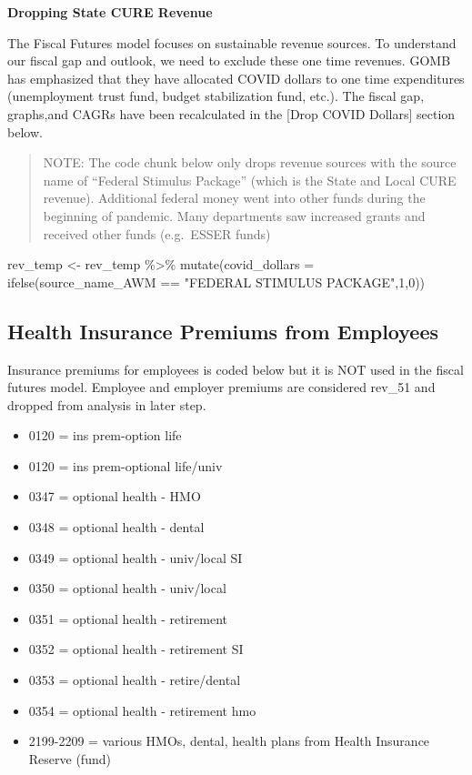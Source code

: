 \documentclass[
  letterpaper,
  DIV=11,
  numbers=noendperiod]{scrreport}
\newenvironment{Shaded}{\begin{snugshade}}{\end{snugshade}}
\newcommand{\AttributeTok}[1]{\textcolor[rgb]{0.40,0.45,0.13}{#1}}
\newcommand{\DecValTok}[1]{\textcolor[rgb]{0.68,0.00,0.00}{#1}}
\newcommand{\FunctionTok}[1]{\textcolor[rgb]{0.28,0.35,0.67}{#1}}
\newcommand{\NormalTok}[1]{\textcolor[rgb]{0.00,0.23,0.31}{#1}}
\newcommand{\OtherTok}[1]{\textcolor[rgb]{0.00,0.23,0.31}{#1}}
\newcommand{\SpecialCharTok}[1]{\textcolor[rgb]{0.37,0.37,0.37}{#1}}
\newcommand{\StringTok}[1]{\textcolor[rgb]{0.13,0.47,0.30}{#1}}
\providecommand{\tightlist}{%
  \setlength{\itemsep}{0pt}\setlength{\parskip}{0pt}}\usepackage{longtable,booktabs,array}
\begin{document}
\textbf{Dropping State CURE Revenue}

The Fiscal Futures model focuses on sustainable revenue sources. To
understand our fiscal gap and outlook, we need to exclude these one time
revenues. GOMB has emphasized that they have allocated COVID dollars to
one time expenditures (unemployment trust fund, budget stabilization
fund, etc.). The fiscal gap, graphs,and CAGRs have been recalculated in
the {[}Drop COVID Dollars{]} section below.

\begin{quote}
NOTE: The code chunk below only drops revenue sources with the source
name of ``Federal Stimulus Package'' (which is the State and Local CURE
revenue). Additional federal money went into other funds during the
beginning of pandemic. Many departments saw increased grants and
received other funds (e.g.~ESSER funds)
\end{quote}

\begin{Shaded}
\begin{Highlighting}[]
\NormalTok{rev\_temp }\OtherTok{\textless{}{-}}\NormalTok{ rev\_temp }\SpecialCharTok{\%\textgreater{}\%} \FunctionTok{mutate}\NormalTok{(}\AttributeTok{covid\_dollars =} \FunctionTok{ifelse}\NormalTok{(source\_name\_AWM }\SpecialCharTok{==} \StringTok{"FEDERAL STIMULUS PACKAGE"}\NormalTok{,}\DecValTok{1}\NormalTok{,}\DecValTok{0}\NormalTok{))}
\end{Highlighting}
\end{Shaded}

\hypertarget{health-insurance-premiums-from-employees}{%
\subsection{Health Insurance Premiums from
Employees}\label{health-insurance-premiums-from-employees}}

Insurance premiums for employees is coded below but it is NOT used in
the fiscal futures model. Employee and employer premiums are considered
rev\_51 and dropped from analysis in later step.

\begin{itemize}
\tightlist
\item
  0120 = ins prem-option life
\item
  0120 = ins prem-optional life/univ
\item
  0347 = optional health - HMO
\item
  0348 = optional health - dental
\item
  0349 = optional health - univ/local SI
\item
  0350 = optional health - univ/local
\item
  0351 = optional health - retirement
\item
  0352 = optional health - retirement SI
\item
  0353 = optional health - retire/dental
\item
  0354 = optional health - retirement hmo
\item
  2199-2209 = various HMOs, dental, health plans from Health Insurance
  Reserve (fund)
\end{itemize}
\end{document}
